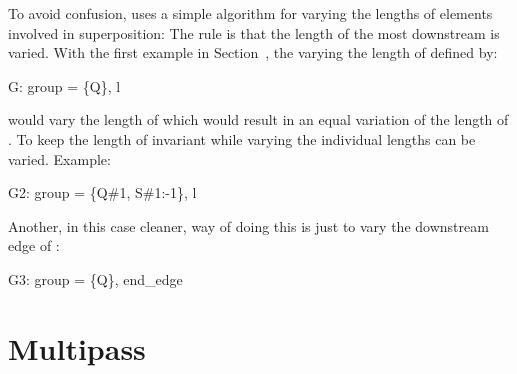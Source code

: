 To avoid confusion, \bmad uses a simple algorithm for varying the
lengths of elements involved in superposition: The rule is that the
length of the most downstream  is varied.
With the first example in Section~, the  
varying the length of  defined by:
\begin{example}
  G: group = \{Q\}, l
\end{example}
would vary the length of  which would result in an equal
variation of the length of . To keep the length of 
invariant while varying  the individual  lengths
can be varied. Example:
\begin{example}
  G2: group = \{Q{\#}1, S{\#}1:-1\}, l
\end{example}
Another, in this case cleaner, way of doing this is just to vary the
downstream edge of :
\begin{example}
  G3: group = \{Q\}, end_edge
\end{example}

\section{Multipass}
\label{s:multipass}

